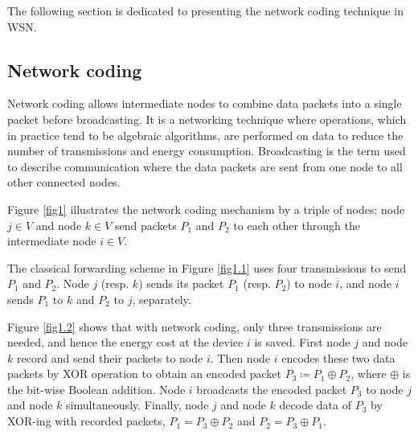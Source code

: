 The following section is dedicated to presenting the network coding technique in WSN. 

\subsection{Network coding} \label{sec1.subsec2}
Network coding allows intermediate nodes to combine data packets into a single packet before broadcasting. It is a networking technique where operations, which in practice tend to be algebraic algorithms, are performed on data to reduce the number of transmissions and energy consumption.
Broadcasting is the term used to describe communication where the data packets are sent from one node to all other connected nodes.

Figure \eqref{fig1} illustrates the network coding mechanism by a triple of nodes; node \(j \in V\) and node \(k \in V\) send packets \(P_1\) and \(P_2\) to each other through the intermediate node \(i \in V\).
 
 The classical forwarding scheme in Figure \eqref{fig1.1} uses four transmissions to send \(P_1\) and \(P_2\). Node \(j\) (resp. \(k\)) sends its packet \(P_1\) (resp. \(P_2\)) to node \(i\), and node \(i\) sends \(P_1\) to \(k\) and \(P_2\) to \(j\), separately.

Figure \eqref{fig1.2} shows that with network coding, only three transmissions are needed, and hence the energy cost at the device \(i\) is saved. 
First node \(j\) and node \(k\) record and send their packets to node \(i\). Then node \(i\) encodes these two data packets by XOR operation to obtain an encoded packet \(P_3 \coloneqq P_1 \oplus P_2\), where $\oplus$ is the bit-wise Boolean addition. Node \(i\) broadcasts the encoded packet \(P_3\) to  node \(j\) and node \(k\) simultaneously. Finally, node \(j\) and node \(k\) decode data of \(P_3\) by XOR-ing with recorded packets,  \(P_1 = P_3 \oplus P_2\) and \(P_2 = P_3 \oplus P_1\).

